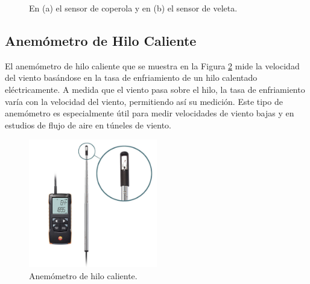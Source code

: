 \begin{figure}[H]
\begin{minipage}[b]{0.4\textwidth}
    \end{minipage}%
    \caption{En (a) el sensor de coperola y en (b) el sensor de veleta. \cite{siapmicros2024}}
    \label{fig:copas_y_veleta}
\end{figure}
\subsection*{Anemómetro de Hilo Caliente}

El anemómetro de hilo caliente que se muestra en la Figura \ref{fig:hiloCaliente} mide la velocidad del viento basándose en la tasa de enfriamiento de un hilo calentado eléctricamente. A medida que el viento pasa sobre el hilo, la tasa de enfriamiento varía con la velocidad del viento, permitiendo así su medición. Este tipo de anemómetro es especialmente útil para medir velocidades de viento bajas y en estudios de flujo de aire en túneles de viento.

\begin{figure}[H]
    \centering
    \includegraphics[width=0.5\textwidth]{Figuras/viento/sensores/hiloCaliente.png}
    \caption{Anemómetro de hilo caliente. \cite{testoAnemometer}}
    \label{fig:hiloCaliente}
\end{figure}

